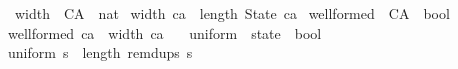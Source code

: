 \begin{isabellebody}
%
\isatagdocument
%
\isamarkuptrue%
%
\endisatagdocument
{\isafolddocument}%
%
\isadelimdocument
%
\endisadelimdocument
{}\isamarkupfalse%
\ width\ {\isacharcolon}{\isacharcolon}\ {\isachardoublequoteopen}CA\ {\isasymRightarrow}\ nat{\isachardoublequoteclose}\ \isanewline
{\isachardoublequoteopen}width\ ca\ {\isacharequal}\ length\ {\isacharparenleft}State\ ca{\isacharparenright}{\isachardoublequoteclose}\isanewline
\isanewline
{}\isamarkupfalse%
\ wellformed\ {\isacharcolon}{\isacharcolon}\ {\isachardoublequoteopen}CA\ {\isasymRightarrow}\ bool{\isachardoublequoteclose}\ \isanewline
{\isachardoublequoteopen}wellformed\ ca\ {\isasymequiv}\ {\isacharparenleft}width\ ca\ {\isasymge}\ {}{\isacharparenright}{\isachardoublequoteclose}\isanewline
\isanewline
\isanewline
{}\isamarkupfalse%
\ uniform\ {\isacharcolon}{\isacharcolon}\ {\isachardoublequoteopen}state\ {\isasymRightarrow}\ bool{\isachardoublequoteclose}\ \isanewline
{\isachardoublequoteopen}uniform\ s\ {\isasymequiv}\ length\ {\isacharparenleft}remdups\ s{\isacharparenright}\ {\isacharequal}\ {}{\isachardoublequoteclose}\isanewline
%
\isadelimtheory
%
\endisadelimtheory
%
\isatagtheory
{}\isamarkupfalse%
%
\endisatagtheory
{\isafoldtheory}%
%
\isadelimtheory
%
\endisadelimtheory
%
\end{isabellebody}%
\endinput
